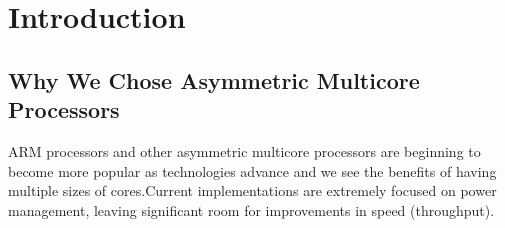 \section{Introduction}
\subsection{Why We Chose Asymmetric Multicore Processors}
ARM processors and other asymmetric multicore processors are beginning to become more popular as technologies advance and we see the benefits of having multiple sizes of cores.Current implementations are extremely focused on power management, leaving significant room for improvements in speed (throughput).

